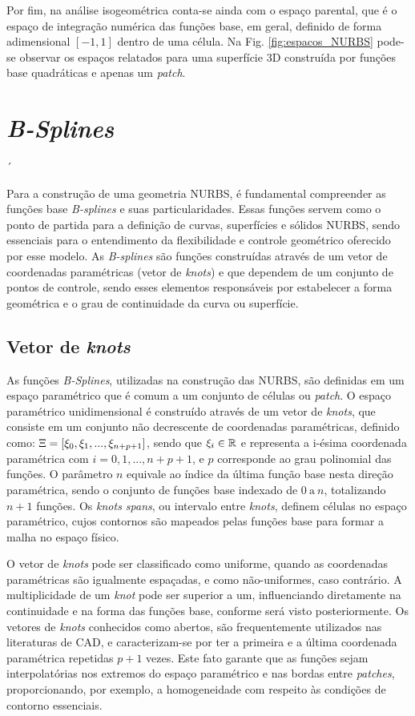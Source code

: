 \documentclass[tese_patricia]{subfiles}
\begin{document}
Por fim, na análise isogeométrica conta-se ainda com o espaço parental, que é o espaço de integração numérica das funções base, em geral, definido de forma adimensional $[-1, 1]$ dentro de uma célula. Na Fig. \ref{fig:espacos_NURBS} pode-se observar os espaços relatados para uma superfície 3D construída por funções base quadráticas e apenas um \textit{patch}. 

\section{\textit{B-Splines}} \label{capitulo:Cap3:Bsplines}´

Para a construção de uma geometria NURBS, é fundamental compreender as funções base \textit{B-splines} e suas particularidades. Essas funções servem como o ponto de partida para a definição de curvas, superfícies e sólidos NURBS, sendo essenciais para o entendimento da flexibilidade e controle geométrico oferecido por esse modelo. As \textit{B-splines} são funções construídas através de um vetor de coordenadas paramétricas (vetor de \textit{knots}) e que dependem de um conjunto de pontos de controle, sendo esses elementos responsáveis por estabelecer a forma geométrica e o grau de continuidade da curva ou superfície.


\subsection{Vetor de \textit{knots}}

As funções \textit{B-Splines}, utilizadas na construção das NURBS, são definidas em um espaço paramétrico que é comum a um conjunto de células ou \textit{patch}. O espaço paramétrico unidimensional é construído através de um vetor de \textit{knots}, que consiste em um conjunto não decrescente de coordenadas paramétricas, definido como: $\Xi=\left[\xi_{0},\xi_{1},...,\xi_{n+p+1}\right]$,  sendo que $\xi_{i}\in \mathbb{R}$ e representa a i-ésima coordenada paramétrica  com $i = 0, 1, ..., n+p+1$, e $p$ corresponde ao grau polinomial das funções. O parâmetro 
$n$ equivale ao índice da última função base nesta direção paramétrica, sendo o conjunto de funções base indexado de 
$0 \ \text{a}  \ n$, totalizando $n+1$ funções. Os \textit{knots spans}, ou intervalo entre \textit{knots}, definem células no espaço paramétrico, cujos contornos são mapeados pelas funções base para formar a malha no espaço físico. 

O vetor de \textit{knots} pode ser classificado como uniforme, quando as coordenadas paramétricas são igualmente espaçadas, e como não-uniformes, caso contrário.
A multiplicidade de um \textit{knot} pode ser superior a um, influenciando diretamente na continuidade e na forma das funções base, conforme será visto posteriormente.  Os vetores de \textit{knots} conhecidos como abertos, são frequentemente utilizados nas literaturas de CAD, e caracterizam-se por ter a primeira e a última coordenada paramétrica repetidas $p+1$ vezes. Este fato garante que as funções sejam interpolatórias nos extremos do espaço paramétrico e nas bordas entre \textit{patches}, proporcionando, por exemplo, a homogeneidade com respeito às condições de contorno essenciais. 
\end{document}
